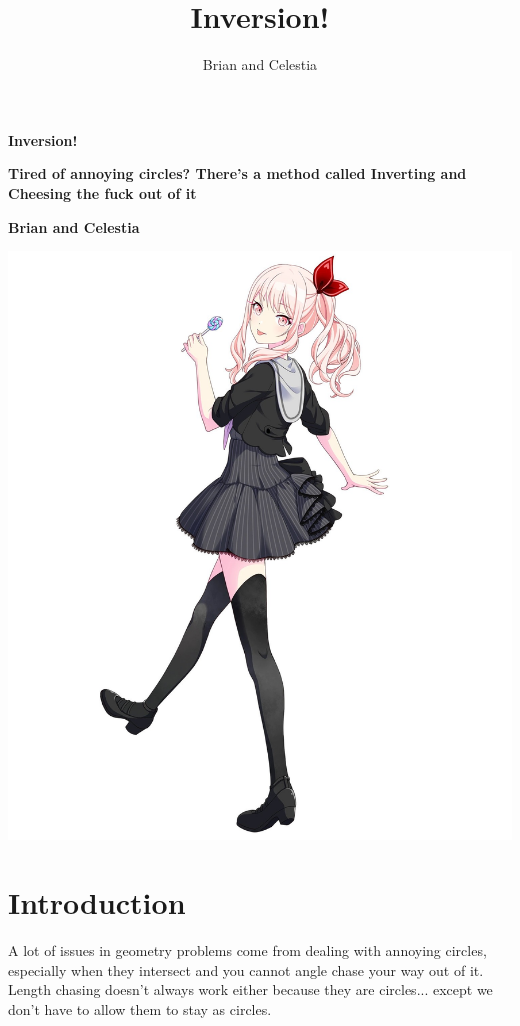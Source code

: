 \documentclass{scrartcl}
\begin{document}
\begin{titlepage}
   \begin{center}
       \vspace*{1.5cm}
       \huge \textbf{Inversion!}

       \vspace{0.5cm}
       \Large \textbf{Tired of annoying circles? There's a method called Inverting and Cheesing the fuck out of it}
            
       \vspace{1.5cm}

       \textbf{Brian and Celestia}

       \vfill
            
        \includegraphics[scale=0.2]{mizuki.jpg}
    \end{center}    
\end{titlepage}
\newpage
\title{Inversion!}
\author{Brian and Celestia}

\section{Introduction}
A lot of issues in geometry problems come from dealing with annoying circles, especially when they intersect and you cannot angle chase your way out of it. Length chasing doesn't always work either because they are circles... except we don't have to allow them to stay as circles.
\end{document}
